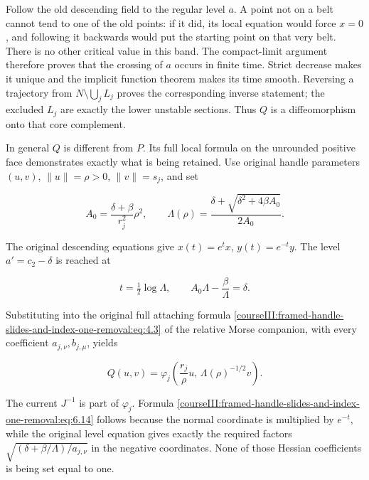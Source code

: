Follow the old descending field to the regular level \(a\). A point not on a belt cannot tend to one of the old points: if it did, its local equation would force \(x=0\), and following it backwards would put the starting point on that very belt. There is no other critical value in this band. The compact-limit argument therefore proves that the crossing of \(a\) occurs in finite time. Strict decrease makes it unique and the implicit function theorem makes its time smooth. Reversing a trajectory from \(N\setminus\bigcup_jL_j\) proves the corresponding inverse statement; the excluded \(L_j\) are exactly the lower unstable sections. Thus \(Q\) is a diffeomorphism onto that core complement.

In general \(Q\) is different from \(P\). Its full local formula on the unrounded positive face demonstrates exactly what is being retained. Use original handle parameters \((u,v)\), \(\|u\|=\rho>0\), \(\|v\|=s_j\), and set

\begin{equation}
A_0=\frac{\delta+\beta}{r_j^2}\rho^2,\qquad
 \Lambda(\rho)
 =\frac{\delta+\sqrt{\delta^2+4\beta A_0}}{2A_0}.
 \label{courseIII:framed-handle-slides-and-index-one-removal:eq:6.12}
\end{equation}

The original descending equations give \(x(t)=e^t x\), \(y(t)=e^{-t}y\). The level \(a'=c_2-\delta\) is reached at

\begin{equation}
t=\tfrac12\log\Lambda,\qquad
 A_0\Lambda-\frac{\beta}{\Lambda}=\delta.
 \label{courseIII:framed-handle-slides-and-index-one-removal:eq:6.13}
\end{equation}

Substituting into the original full attaching formula \eqref{courseIII:framed-handle-slides-and-index-one-removal:eq:4.3} of the relative Morse companion, with every coefficient \(a_{j,\nu},b_{j,\mu}\), yields

\begin{equation}
Q(u,v)=
 \varphi_j\left(\frac{r_j}{\rho}u,\,
                    \Lambda(\rho)^{-1/2}v\right).
 \label{courseIII:framed-handle-slides-and-index-one-removal:eq:6.14}
\end{equation}

The current \(J^{-1}\) is part of \(\varphi_j\). Formula \eqref{courseIII:framed-handle-slides-and-index-one-removal:eq:6.14} follows because the normal coordinate is multiplied by \(e^{-t}\), while the original level equation gives exactly the required factors
\(\sqrt{(\delta+\beta/\Lambda)/a_{j,\nu}}\) in the negative coordinates. None of those Hessian coefficients is being set equal to one.


